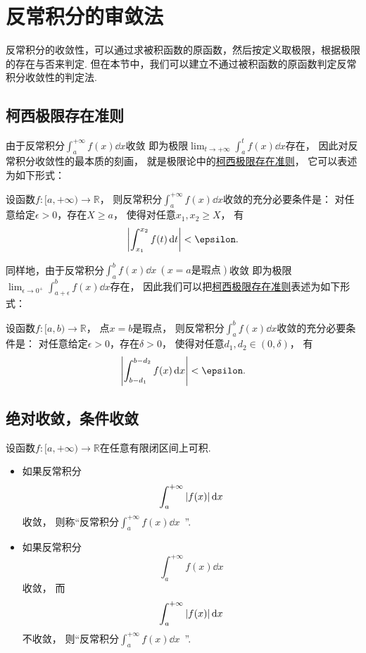 \section{反常积分的审敛法}
反常积分的收敛性，可以通过求被积函数的原函数，然后按定义取极限，根据极限的存在与否来判定.
但在本节中，我们可以建立不通过被积函数的原函数判定反常积分收敛性的判定法.

\subsection{柯西极限存在准则}
由于反常积分\(\int_a^{+\infty} f(x) \dd{x}\)收敛
即为极限\(\lim_{t\to+\infty} \int_a^t f(x) \dd{x}\)存在，
因此对反常积分收敛性的最本质的刻画，
就是极限论中的\hyperref[theorem:极限.函数的柯西极限存在准则]{柯西极限存在准则}，
它可以表述为如下形式：
\begin{theorem}\label{theorem:反常积分.柯西极限存在准则}
设函数\(f\colon[a,+\infty)\to\mathbb{R}\)，
则反常积分\(\int_a^{+\infty} f(x) \dd{x}\)收敛的充分必要条件是：
对任意给定\(\epsilon>0\)，存在\(X \geq a\)，
使得对任意\(x_1,x_2 \geq X\)，
有\[
	\abs{\int_{x_1}^{x_2} f(t) \dd{t}} < \epsilon.
\]
\end{theorem}

同样地，由于反常积分\(\int_a^b f(x) \dd{x}\ (\text{$x=a$是瑕点})\)收敛
即为极限\(\lim_{\epsilon\to0^+} \int_{a+\epsilon}^b f(x) \dd{x}\)存在，
因此我们可以把\hyperref[theorem:极限.函数的柯西极限存在准则]{柯西极限存在准则}表述为如下形式：
\begin{theorem}
设函数\(f\colon[a,b)\to\mathbb{R}\)，
点\(x=b\)是瑕点，
则反常积分\(\int_a^b f(x) \dd{x}\)收敛的充分必要条件是：
对任意给定\(\epsilon>0\)，存在\(\delta>0\)，
使得对任意\(d_1,d_2\in(0,\delta)\)，
有\[
	\abs{\int_{b-d_1}^{b-d_2} f(x) \dd{x}} < \epsilon.
\]
\end{theorem}

\subsection{绝对收敛，条件收敛}
\begin{definition}
设函数\(f\colon[a,+\infty)\to\mathbb{R}\)在任意有限闭区间上可积.
\begin{itemize}
	\item 如果反常积分\[
		\int_a^{+\infty} \abs{f(x)} \dd{x}
	\]收敛，
	则称“反常积分\(\int_a^{+\infty} f(x) \dd{x}\)~”.

	\item 如果反常积分\[
		\int_a^{+\infty} f(x) \dd{x}
	\]收敛，
	而\[
		\int_a^{+\infty} \abs{f(x)} \dd{x}
	\]不收敛，
	则“反常积分\(\int_a^{+\infty} f(x) \dd{x}\)~”.
\end{itemize}
\end{definition}

